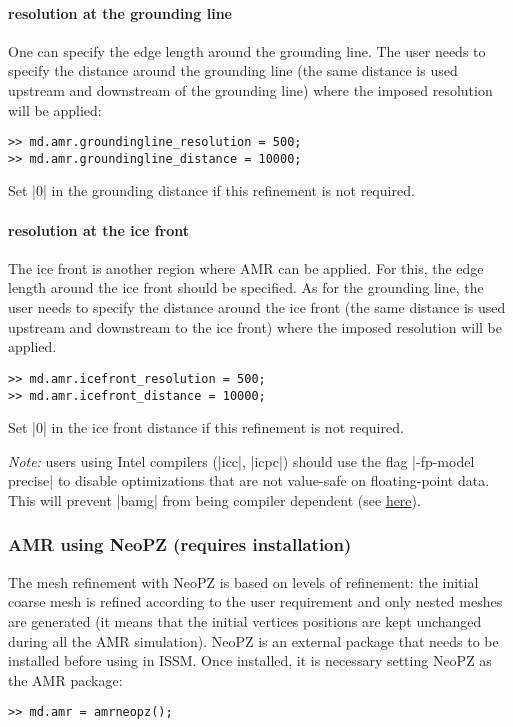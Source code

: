 \paragraph{resolution at the grounding line}
One can specify the edge length around the grounding line. The user needs to specify the distance around the grounding line (the same distance is used upstream and downstream of the grounding line) where the imposed resolution will be applied:
\begin{lstlisting}
>> md.amr.groundingline_resolution = 500;
>> md.amr.groundingline_distance = 10000;
\end{lstlisting}
Set \lstinlinebg|0| in the grounding distance if this refinement is not required.

\paragraph{resolution at the ice front}
The ice front is another region where AMR can be applied. For this, the edge length around the ice front should be specified. As for the grounding line, the user needs to specify the distance around the ice front (the same distance is used upstream and downstream to the ice front) where the imposed resolution will be applied.
\begin{lstlisting}
>> md.amr.icefront_resolution = 500;
>> md.amr.icefront_distance = 10000;
\end{lstlisting}
Set \lstinlinebg|0| in the ice front distance if this refinement is not required.

\emph{Note:} users using Intel compilers (\lstinlinebg|icc|, \lstinlinebg|icpc|) should use the flag \lstinlinebg|-fp-model precise| to disable optimizations that are not value-safe on floating-point data. This will prevent \lstinlinebg|bamg| from being compiler dependent (see \href{https://software.intel.com/en-us/node/522979}{here}).
\subsubsection{AMR using NeoPZ (requires installation)}%
The mesh refinement with NeoPZ is based on levels of refinement: the initial coarse mesh is refined according to the user requirement and only nested meshes are generated (it means that the initial vertices positions are kept unchanged during all the AMR simulation). NeoPZ is an external package that needs to be installed before using in ISSM. Once installed, it is necessary setting NeoPZ as the AMR package:
\begin{lstlisting}
>> md.amr = amrneopz();
\end{lstlisting}

